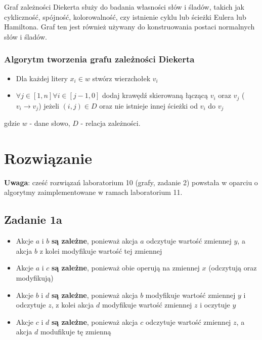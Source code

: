 \documentclass[11pt]{article}
\providecommand{\tightlist}{%
      \setlength{\itemsep}{0pt}\setlength{\parskip}{0pt}}
\begin{document}
Graf zależności Diekerta służy do badania własności słów i śladów,
takich jak cykliczność, spójność, kolorowalność, czy istnienie cyklu lub
ścieżki Eulera lub Hamiltona. Graf ten jest również używany do
konstruowania postaci normalnych słów i śladów.

    \hypertarget{algorytm-tworzenia-grafu-zaleux17cnoux15bci-diekerta}{%
\subsubsection{Algorytm tworzenia grafu zależności
Diekerta}\label{algorytm-tworzenia-grafu-zaleux17cnoux15bci-diekerta}}

\begin{itemize}
\tightlist
\item
  Dla każdej litery \(x_i \in w\) stwórz wierzchołek \(v_i\)
\item
  \(\forall j \in [1, n] \forall i \in [j - 1, 0]\) dodaj krawędź
  skierowaną łączącą \(v_i\) oraz \(v_j\) (\(v_i \rightarrow v_j\))
  jeżeli \((i, j) \in D\) oraz nie istnieje innej ścieżki od \(v_i\) do
  \(v_j\)
\end{itemize}

gdzie \(w\) - dane słowo, \(D\) - relacja zależności.

    \hypertarget{rozwiux105zanie}{%
\section{Rozwiązanie}\label{rozwiux105zanie}}

    \textbf{Uwaga}: cześć rozwiązań laboratorium 10 (grafy, zadanie 2)
powstała w oparciu o algorytmy zaimplementowane w ramach laboratorium
11.

    \hypertarget{zadanie-1a}{%
\subsection{Zadanie 1a}\label{zadanie-1a}}

\begin{itemize}
\item
  Akcje \(a\) i \(b\) \textbf{są zależne}, ponieważ akcja \(a\)
  odczytuje wartość zmiennej \(y\), a akcja \(b\) z kolei modyfikuje
  wartość tej zmiennej
\item
  Akcje \(a\) i \(c\) \textbf{są zależne}, ponieważ obie operują na
  zmiennej \(x\) (odczytują oraz modyfikują)
\item
  Akcje \(b\) i \(d\) \textbf{są zależne}, ponieważ akcja \(b\)
  modyfikuje wartość zmiennej \(y\) i odczytuje \(z\), z kolei akcja
  \(d\) modyfikuje wartość zmiennej \(z\) i oczytuje \(y\)
\item
  Akcje \(c\) i \(d\) \textbf{są zależne}, ponieważ akcja \(c\)
  odczytuje wartość zmiennej \(z\), a akcja \(d\) modufikuje tę zmienną
\end{itemize}
\end{document}
